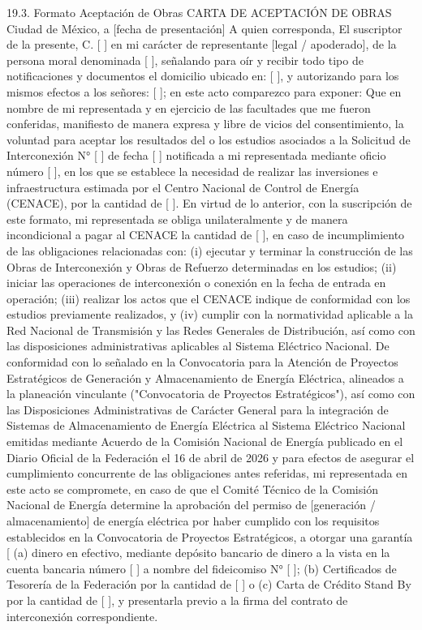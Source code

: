  \par
19.3. Formato Aceptación de Obras
CARTA DE ACEPTACIÓN DE OBRAS
Ciudad de México, a [fecha de presentación]
A quien corresponda,
El suscriptor de la presente, C. [ ] en mi carácter de representante [legal / apoderado], de la persona moral denominada [ ], señalando para oír y recibir todo tipo de notificaciones y documentos el domicilio ubicado en: [ ], y autorizando para los mismos efectos a los señores: [ ]; en este acto comparezco para exponer:
Que en nombre de mi representada y en ejercicio de las facultades que me fueron conferidas, manifiesto de manera expresa y libre de vicios del consentimiento, la voluntad para aceptar los resultados del o los estudios asociados a la Solicitud de Interconexión N° [ ] de fecha [ ] notificada a mi representada mediante oficio número [ ], en los que se establece la necesidad de realizar las inversiones e infraestructura estimada por el Centro Nacional de Control de Energía (CENACE), por la cantidad de [ ].
En virtud de lo anterior, con la suscripción de este formato, mi representada se obliga unilateralmente y de manera incondicional a pagar al CENACE la cantidad de [ ], en caso de incumplimiento de las obligaciones relacionadas con: (i) ejecutar y terminar la construcción de las Obras de Interconexión y Obras de Refuerzo determinadas en los estudios; (ii) iniciar las operaciones de interconexión o conexión en la fecha de entrada en operación; (iii) realizar los actos que el CENACE indique de conformidad con los estudios previamente realizados, y (iv) cumplir con la normatividad aplicable a la Red Nacional de Transmisión y las Redes Generales de Distribución, así como con las disposiciones administrativas aplicables al Sistema Eléctrico Nacional.
De conformidad con lo señalado en la Convocatoria para la Atención de Proyectos Estratégicos de Generación y Almacenamiento de Energía Eléctrica, alineados a la planeación vinculante ("Convocatoria de Proyectos Estratégicos"), así como con las Disposiciones Administrativas de Carácter General para la integración de Sistemas de Almacenamiento de Energía Eléctrica al Sistema Eléctrico Nacional emitidas mediante Acuerdo de la Comisión Nacional de Energía publicado en el Diario Oficial de la Federación el 16 de abril de 2026 y para efectos de asegurar el cumplimiento concurrente de las obligaciones antes referidas, mi representada en este acto se compromete, en caso de que el Comité Técnico de la Comisión Nacional de Energía determine la aprobación del permiso de [generación / almacenamiento] de energía eléctrica por haber cumplido con los requisitos establecidos en la Convocatoria de Proyectos Estratégicos, a otorgar una garantía [ (a) dinero en efectivo, mediante depósito bancario de dinero a la vista en la cuenta bancaria número [ ] a nombre del fideicomiso N° [ ]; (b) Certificados de Tesorería de la Federación por la cantidad de [ ] o (c) Carta de Crédito Stand By por la cantidad de [ ], y presentarla previo a la firma del contrato de interconexión correspondiente.
